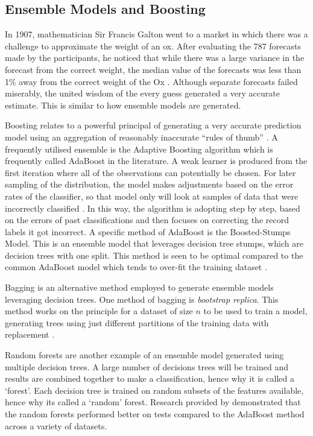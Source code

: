 \subsection{Ensemble Models and Boosting} \label{boosting}

In 1907, mathematician Sir Francis Galton went to a market in which there was a challenge
to approximate the weight of an ox. After evaluating the 787 forecasts made by the
participants, he noticed that while there was a large variance in the forecast from the correct weight, the median value of the
forecasts was less than 1\% away from the correct weight of the Ox \citep{galton_vox_1907}. Although separate forecasts failed miserably, the united wisdom of the every guess generated a very accurate estimate. This is similar to how ensemble models are generated.


Boosting relates to a powerful principal of generating a very accurate prediction model using an aggregation of reasonably inaccurate ``rules of thumb'' \citep{freund_short_1999}. A frequently utilised ensemble is the Adaptive Boosting algorithm which is frequently called AdaBoost in the literature. A weak learner is produced from the first iteration where all of the observations can potentially be chosen. For later sampling of the distribution, the model makes adjustments based on the error rates of the classifier, so that model only will look at samples of data that were incorrectly classified \citep{freund_short_1999}. In this way, the algorithm is adopting step by step, based on the errors of past classifications and then focuses on correcting the record labels it got incorrect. A specific method of AdaBoost is the Boosted-Stumps Model. This is an ensemble model that leverages decision tree stumps, which are decision trees with one split. This method is seen to be optimal compared to the common AdaBoost model which tends to over-fit the training dataset \citep{caruana_empirical_2006}.

Bagging is an alternative method employed to generate ensemble models leveraging decision trees. One method of bagging is \textit{bootstrap replica}. This method works on the principle for a dataset of size $n$ to be used to train a model, generating trees using just different partitions of the training data with replacement \citep{dietterich_experimental_2000}. 

Random forests are another example of an ensemble model generated using multiple decision trees. A large number of decisions trees will be trained and results are combined together to make a classification, hence why it is called a `forest'. Each decision tree is trained on random subsets of the features available, hence why its called a `random' forest. Research provided by \cite{breiman_random_2001} demonstrated that the random forests performed better on tests compared to the AdaBoost method across a variety of datasets.


